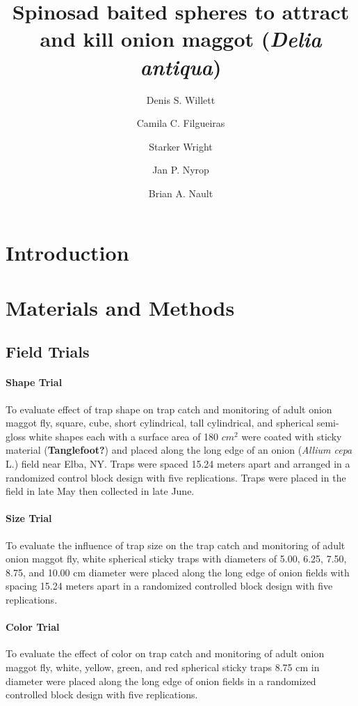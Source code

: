 \documentclass[alpha-refs]{wiley-article}
\title{Spinosad baited spheres to attract and kill onion maggot (\textit{Delia antiqua})}
\author[1\authfn{1}]{Denis S. Willett}
\author[1\authfn{1}]{Camila C. Filgueiras}
\author[2]{Starker Wright}
\author[1]{Jan P. Nyrop}
\author[1]{Brian A. Nault}
\affil[1]{Department of Entomology, Cornell AgriTech, Cornell University, Geneva, NY, 14456, USA}
\affil[2]{Bartlett Tree Experts, Dublin, PA, USA}
\begin{document}
\maketitle

\begin{abstract}

\end{abstract}

\linenumbers
\section{Introduction}
\section{Materials and Methods}

\subsection{Field Trials}

\paragraph{Shape Trial} To evaluate effect of trap shape on trap catch and monitoring of adult onion maggot fly, square, cube, short cylindrical, tall cylindrical, and spherical semi-gloss white shapes each with a surface area of 180 $cm^2$  were coated with sticky material (\textbf{Tanglefoot?}) and placed along the long edge of an onion (\textit{Allium cepa} L.) field near Elba, NY.  Traps were spaced 15.24 meters apart and arranged in a randomized control block design with five replications.  Traps were placed in the field in late May then collected in late June.   

\paragraph{Size Trial}
To evaluate the influence of trap size on the trap catch and monitoring of adult onion maggot fly, white spherical sticky traps with diameters of 5.00, 6.25, 7.50, 8.75, and 10.00 cm diameter were placed along the long edge of onion fields with spacing 15.24 meters apart in a randomized controlled block design with five replications.  

\paragraph{Color Trial}
To evaluate the effect of color on trap catch and monitoring of adult onion maggot fly, white, yellow, green, and red spherical sticky traps 8.75 cm in diameter were placed along the long edge of onion fields in a randomized controlled block design with five replications.  
\end{document}
